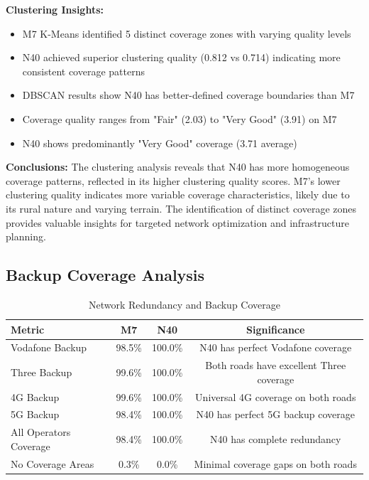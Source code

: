 \documentclass[MScCS]{uccthesis}
\begin{document}
\textbf{Clustering Insights:}
\begin{itemize}
\item M7 K-Means identified 5 distinct coverage zones with varying quality levels
\item N40 achieved superior clustering quality (0.812 vs 0.714) indicating more consistent coverage patterns
\item DBSCAN results show N40 has better-defined coverage boundaries than M7
\item Coverage quality ranges from "Fair" (2.03) to "Very Good" (3.91) on M7
\item N40 shows predominantly "Very Good" coverage (3.71 average)
\end{itemize}

\textbf{Conclusions:} The clustering analysis reveals that N40 has more homogeneous coverage patterns, reflected in its higher clustering quality scores. M7's lower clustering quality indicates more variable coverage characteristics, likely due to its rural nature and varying terrain. The identification of distinct coverage zones provides valuable insights for targeted network optimization and infrastructure planning.

\subsection{Backup Coverage Analysis}

\begin{table}[H]
\centering
\caption{Network Redundancy and Backup Coverage}
\label{tab:backup_coverage}
\begin{tabular}{|l|c|c|c|}
\hline
\textbf{Metric} & \textbf{M7} & \textbf{N40} & \textbf{Significance} \\
\hline
Vodafone Backup & 98.5\% & 100.0\% & N40 has perfect Vodafone coverage \\
\hline
Three Backup & 99.6\% & 100.0\% & Both roads have excellent Three coverage \\
\hline
4G Backup & 99.6\% & 100.0\% & Universal 4G coverage on both roads \\
\hline
5G Backup & 98.4\% & 100.0\% & N40 has perfect 5G backup coverage \\
\hline
All Operators Coverage & 98.4\% & 100.0\% & N40 has complete redundancy \\
\hline
No Coverage Areas & 0.3\% & 0.0\% & Minimal coverage gaps on both roads \\
\hline
\end{tabular}
\end{table}
\end{document}
